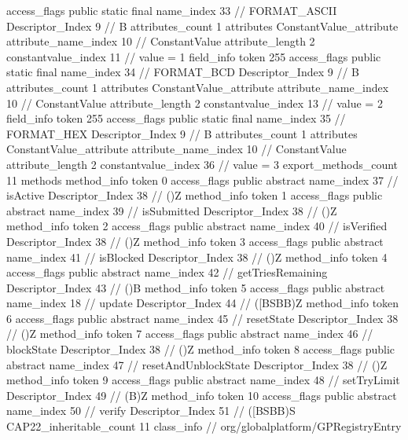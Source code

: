 {{{{{				access_flags	public static final
				name_index	33		// FORMAT_ASCII
				Descriptor_Index	9		// B
				attributes_count	1
				attributes {
				ConstantValue_attribute {
					attribute_name_index	10		// ConstantValue
					attribute_length	2
					constantvalue_index	11		// value = 1
				}
				}
			}
			field_info {
				token	255
				access_flags	public static final
				name_index	34		// FORMAT_BCD
				Descriptor_Index	9		// B
				attributes_count	1
				attributes {
				ConstantValue_attribute {
					attribute_name_index	10		// ConstantValue
					attribute_length	2
					constantvalue_index	13		// value = 2
				}
				}
			}
			field_info {
				token	255
				access_flags	public static final
				name_index	35		// FORMAT_HEX
				Descriptor_Index	9		// B
				attributes_count	1
				attributes {
				ConstantValue_attribute {
					attribute_name_index	10		// ConstantValue
					attribute_length	2
					constantvalue_index	36		// value = 3
				}
				}
			}
			}
			export_methods_count	11
			methods {
				method_info {
					token	0
					access_flags	public abstract
					name_index	37		// isActive
					Descriptor_Index	38		// ()Z
				}
				method_info {
					token	1
					access_flags	public abstract
					name_index	39		// isSubmitted
					Descriptor_Index	38		// ()Z
				}
				method_info {
					token	2
					access_flags	public abstract
					name_index	40		// isVerified
					Descriptor_Index	38		// ()Z
				}
				method_info {
					token	3
					access_flags	public abstract
					name_index	41		// isBlocked
					Descriptor_Index	38		// ()Z
				}
				method_info {
					token	4
					access_flags	public abstract
					name_index	42		// getTriesRemaining
					Descriptor_Index	43		// ()B
				}
				method_info {
					token	5
					access_flags	public abstract
					name_index	18		// update
					Descriptor_Index	44		// ([BSBB)Z
				}
				method_info {
					token	6
					access_flags	public abstract
					name_index	45		// resetState
					Descriptor_Index	38		// ()Z
				}
				method_info {
					token	7
					access_flags	public abstract
					name_index	46		// blockState
					Descriptor_Index	38		// ()Z
				}
				method_info {
					token	8
					access_flags	public abstract
					name_index	47		// resetAndUnblockState
					Descriptor_Index	38		// ()Z
				}
				method_info {
					token	9
					access_flags	public abstract
					name_index	48		// setTryLimit
					Descriptor_Index	49		// (B)Z
				}
				method_info {
					token	10
					access_flags	public abstract
					name_index	50		// verify
					Descriptor_Index	51		// ([BSBB)S
				}
			}
			CAP22_inheritable_count	11
		}
		class_info {		// org/globalplatform/GPRegistryEntry
}}}
